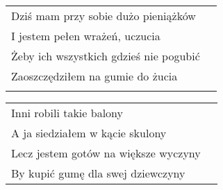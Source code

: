 \documentclass[a5paper]{article}
\begin{document}
\noindent
\begin{tabular}{@{}p{7.50cm}p{3cm}@{}}
Dziś mam przy sobie dużo pieniążków \\
I jestem pełen wrażeń, uczucia \\
Żeby ich wszystkich gdzieś nie pogubić \\
Zaoszczędziłem na gumie do żucia \\ \\
\end{tabular}

\noindent
\begin{tabular}{@{}p{7.50cm}p{3cm}@{}}
Inni robili takie balony \\
A ja siedziałem w kącie skulony \\
Lecz jestem gotów na większe wyczyny \\
By kupić gumę dla swej dziewczyny
\end{tabular}
\end{document}
